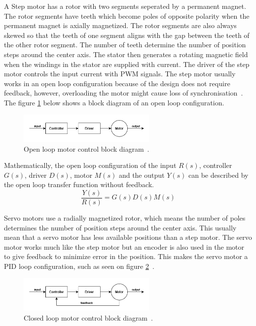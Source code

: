 A Step motor has a rotor with two segments seperated by a permanent magnet. The rotor segments have teeth which become poles of opposite polarity when the permanent magnet is axially magnetized. The rotor segments are also always skewed so that the teeth of one segment aligns with the gap between the teeth of the other rotor segment. The number of teeth determine the number of position steps around the center axis. The stator then generates a rotating magnetic field when the windings in the stator are supplied with current. The driver of the step motor controls the input current with PWM signals. The step motor usually works in an open loop configuration because of the design does not require feedback, however, overloading the motor might cause loss of synchronisation~\cite{servo_step}. The figure \ref{fig:open_loop} below shows a block diagram of an open loop configuration.
\begin{figure}[H]
    \centering
    \includegraphics[width=0.6\textwidth]{figures/open-loop.png}
    \caption{Open loop motor control block diagram~\cite{loop}.} \label{fig:open_loop}
\end{figure}

Mathematically, the open loop configuration of the input $R(s)$, controller $G(s)$, driver $D(s)$, motor $M(s)$ and the output $Y(s)$ can be described by the open loop transfer function without feedback.
\begin{equation}
    \frac{Y(s)}{R(s)} = G(s)D(s)M(s)
\end{equation}

Servo motors use a radially magnetized rotor, which means the number of poles determines the number of position steps around the center axis. This usually mean that a servo motor has less available positions than a step motor. The servo motor works much like the step motor but an encoder is also used in the motor to give feedback to minimize error in the position. This makes the servo motor a PID loop configuration, such as seen on figure \ref{fig:closed_loop}~\cite{servo_step}. 

\begin{figure}[H]
    \centering
    \includegraphics[width=0.6\textwidth]{figures/closed-loop.png}
    \caption{Closed loop motor control block diagram~\cite{loop}.} \label{fig:closed_loop}
\end{figure}

